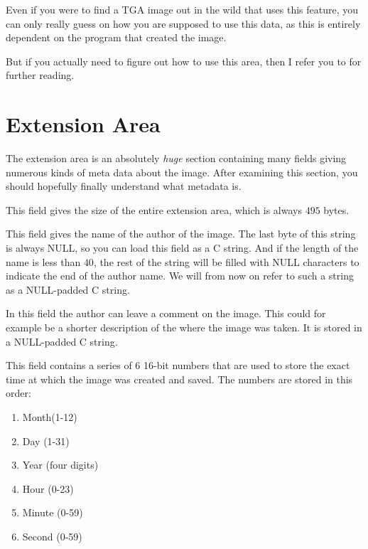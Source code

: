Even if you were to find a TGA image out in the wild that uses this
feature, you can only really guess on how you are supposed to use this
data, as this is entirely dependent on the program that created the
image.

But if you actually need to figure out how to use this area, then I
refer you to
\cite{murray1996encyclopedia,91:_truev_tga_file_format_specif} for
further reading.

\section{Extension Area}
\label{sec:tga-extension-area}

The extension area is an absolutely \textit{huge} section containing
many fields giving numerous kinds of meta data about the image. After
examining this section, you should hopefully finally understand what
metadata is.


This field gives the size of the entire extension area, which is
always $495$ bytes.


This field gives the name of the author of the image. The last byte of
this string is always NULL, so you can load this field as a C
string. And if the length of the name is less than $40$, the rest of
the string will be filled with NULL characters to indicate the end of
the author name. We will from now on refer to such a string as a
NULL-padded C string.


In this field the author can leave a comment on the image. This could
for example be a shorter description of the where the image was
taken. It is stored in a NULL-padded C string.


This field contains a series of 6 16-bit numbers that are used to
store the exact time at which the image was created and saved. The
numbers are stored in this order:

\begin{enumerate}
\item Month(1-12)
\item Day (1-31)
\item Year (four digits)
\item Hour (0-23)
\item Minute (0-59)
\item Second (0-59)
\end{enumerate}

